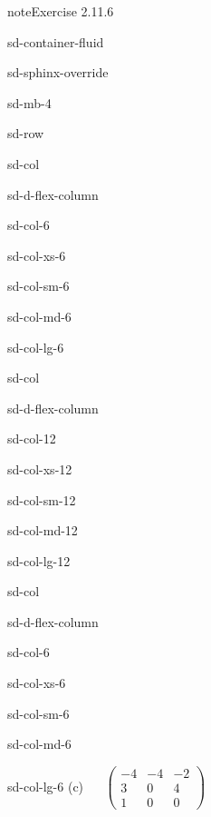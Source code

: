 \documentclass[letterpaper,10pt,english]{jupyterBook}
\begin{document}
\begin{sphinxadmonition}{note}{Exercise 2.11.6}
\begin{sphinxuseclass}{sd-container-fluid}
\begin{sphinxuseclass}{sd-sphinx-override}
\begin{sphinxuseclass}{sd-mb-4}
\begin{sphinxuseclass}{sd-row}
\begin{sphinxuseclass}{sd-col}
\begin{sphinxuseclass}{sd-d-flex-column}
\begin{sphinxuseclass}{sd-col-6}
\begin{sphinxuseclass}{sd-col-xs-6}
\begin{sphinxuseclass}{sd-col-sm-6}
\begin{sphinxuseclass}{sd-col-md-6}
\begin{sphinxuseclass}{sd-col-lg-6}
\end{sphinxuseclass}
\end{sphinxuseclass}
\end{sphinxuseclass}
\end{sphinxuseclass}
\end{sphinxuseclass}
\end{sphinxuseclass}
\end{sphinxuseclass}
\begin{sphinxuseclass}{sd-col}
\begin{sphinxuseclass}{sd-d-flex-column}
\begin{sphinxuseclass}{sd-col-12}
\begin{sphinxuseclass}{sd-col-xs-12}
\begin{sphinxuseclass}{sd-col-sm-12}
\begin{sphinxuseclass}{sd-col-md-12}
\begin{sphinxuseclass}{sd-col-lg-12}
\sphinxAtStartPar
 

\end{sphinxuseclass}
\end{sphinxuseclass}
\end{sphinxuseclass}
\end{sphinxuseclass}
\end{sphinxuseclass}
\end{sphinxuseclass}
\end{sphinxuseclass}
\begin{sphinxuseclass}{sd-col}
\begin{sphinxuseclass}{sd-d-flex-column}
\begin{sphinxuseclass}{sd-col-6}
\begin{sphinxuseclass}{sd-col-xs-6}
\begin{sphinxuseclass}{sd-col-sm-6}
\begin{sphinxuseclass}{sd-col-md-6}
\begin{sphinxuseclass}{sd-col-lg-6}
\sphinxAtStartPar
(c)  
\( \begin{pmatrix} -4 & -4 & - 2\\ 3 & 0 & 4 \\ 1 & 0 & 0 \end{pmatrix} \)


\end{sphinxuseclass}
\end{sphinxuseclass}
\end{sphinxuseclass}
\end{sphinxuseclass}
\end{sphinxuseclass}
\end{sphinxuseclass}
\end{sphinxuseclass}
\end{sphinxuseclass}
\end{sphinxuseclass}
\end{sphinxuseclass}
\end{sphinxuseclass}
\end{sphinxadmonition}
\end{document}

